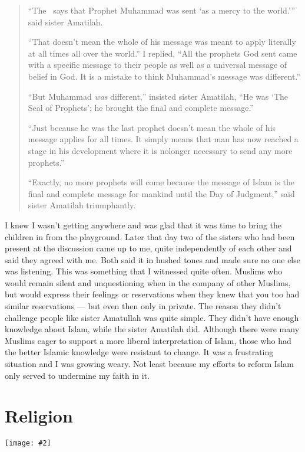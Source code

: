 \documentclass[12pt]{memoir}
\newcommand{\img}[3]{\begin{center}%
\texttt{[image: \#2]}\\{\small\em#3}%
\end{center}}
\begin{document}
\begin{quote}
“The \Quran\ says that Prophet Muhammad was sent ‘as a mercy to the world.’”
said sister Amatilah.

“That doesn’t mean the whole of his message was meant to apply literally
at all times all over the world.”
I replied,
“All the prophets God sent came with a specific message to their people
as well as a universal message of belief in God.
It is a mistake to think Muhammad’s message was different.”

“But Muhammad \emph{was} different,” insisted sister Amatilah,
“He was ‘The Seal of Prophets’; he brought the final and complete message.”

“Just because he was the last prophet doesn’t mean
the whole of his message applies for all times.
It simply means that man has now reached a stage in his development
where it is no\cor{-}{ }longer necessary to send any more prophets.”

“Exactly, no more prophets will come because the message of Islam is the final
and complete message for mankind until the Day of Judgment,”
said sister Amatilah triumphantly.
\end{quote}

I knew I wasn’t getting anywhere and was glad that it was time
to bring the children in from the playground.
Later that day two of the sisters who had been present at the discussion
came up to me, quite independently of each other and said they agreed with me.
Both said it in hushed tones and made sure no one else was listening.
This was something that I witnessed quite often.
Muslims who would remain silent and unquestioning
when in the company of other Muslims,
but would express their feelings or reservations when they knew
that you too had similar reservations — but even then only in private.
The reason they didn’t challenge people like sister Amatullah was quite simple.
They didn’t have enough knowledge about Islam, while the sister Amatilah did.
Although there were many Muslims eager to support
a more liberal interpretation of Islam,
those who had the better Islamic knowledge were resistant to change.
It was a frustrating situation and I was growing weary.
Not least because my efforts to reform Islam only served
to undermine my faith in it.


\chapter{Religion}

\img{scale=0.6}{Neasden_Temple.jpg}{}
\end{document}
